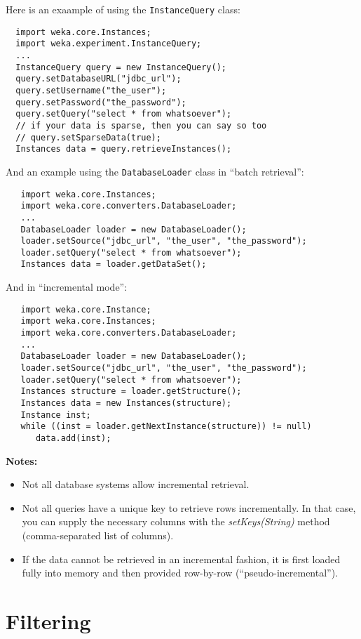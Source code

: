 Here is an exaample of using the \texttt{InstanceQuery} class:
\begin{verbatim}
  import weka.core.Instances;
  import weka.experiment.InstanceQuery;
  ...
  InstanceQuery query = new InstanceQuery();
  query.setDatabaseURL("jdbc_url");
  query.setUsername("the_user");
  query.setPassword("the_password");
  query.setQuery("select * from whatsoever");
  // if your data is sparse, then you can say so too
  // query.setSparseData(true);
  Instances data = query.retrieveInstances();
\end{verbatim}

And an example using the \texttt{DatabaseLoader} class in ``batch retrieval'':
\begin{verbatim}
   import weka.core.Instances;
   import weka.core.converters.DatabaseLoader;
   ...
   DatabaseLoader loader = new DatabaseLoader();
   loader.setSource("jdbc_url", "the_user", "the_password");
   loader.setQuery("select * from whatsoever");
   Instances data = loader.getDataSet();
\end{verbatim}

\samepage
And in ``incremental mode'':
\begin{verbatim}
   import weka.core.Instance;
   import weka.core.Instances;
   import weka.core.converters.DatabaseLoader;
   ...
   DatabaseLoader loader = new DatabaseLoader();
   loader.setSource("jdbc_url", "the_user", "the_password");
   loader.setQuery("select * from whatsoever");
   Instances structure = loader.getStructure();
   Instances data = new Instances(structure);
   Instance inst;
   while ((inst = loader.getNextInstance(structure)) != null)
      data.add(inst);
\end{verbatim}
\textbf{Notes:}
\begin{itemize}
	\item Not all database systems allow incremental retrieval.
	\item Not all queries have a unique key to retrieve rows incrementally. In
that case, you can supply the necessary columns with the
\textit{setKeys(String)} method (comma-separated list of columns).
	\item If the data cannot be retrieved in an incremental fashion, it is first
loaded fully into memory and then provided row-by-row (``pseudo-incremental'').
\end{itemize}


\section{Filtering}

